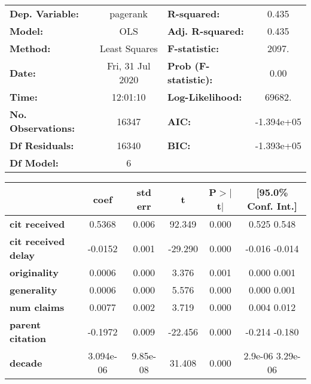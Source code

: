 \begin{center}
\begin{tabular}{lclc}
\toprule
\textbf{Dep. Variable:}     &     pagerank     & \textbf{  R-squared:         } &      0.435    \\
\textbf{Model:}             &       OLS        & \textbf{  Adj. R-squared:    } &      0.435    \\
\textbf{Method:}            &  Least Squares   & \textbf{  F-statistic:       } &      2097.    \\
\textbf{Date:}              & Fri, 31 Jul 2020 & \textbf{  Prob (F-statistic):} &      0.00     \\
\textbf{Time:}              &     12:01:10     & \textbf{  Log-Likelihood:    } &     69682.    \\
\textbf{No. Observations:}  &       16347      & \textbf{  AIC:               } &  -1.394e+05   \\
\textbf{Df Residuals:}      &       16340      & \textbf{  BIC:               } &  -1.393e+05   \\
\textbf{Df Model:}          &           6      & \textbf{                     } &               \\
\bottomrule
\end{tabular}
\begin{tabular}{lccccc}
                            & \textbf{coef} & \textbf{std err} & \textbf{t} & \textbf{P$>$$|$t$|$} & \textbf{[95.0\% Conf. Int.]}  \\
\midrule
\textbf{cit received}       &       0.5368  &        0.006     &    92.349  &         0.000        &         0.525     0.548       \\
\textbf{cit received delay} &      -0.0152  &        0.001     &   -29.290  &         0.000        &        -0.016    -0.014       \\
\textbf{originality}        &       0.0006  &        0.000     &     3.376  &         0.001        &         0.000     0.001       \\
\textbf{generality}         &       0.0006  &        0.000     &     5.576  &         0.000        &         0.000     0.001       \\
\textbf{num claims}         &       0.0077  &        0.002     &     3.719  &         0.000        &         0.004     0.012       \\
\textbf{parent citation}    &      -0.1972  &        0.009     &   -22.456  &         0.000        &        -0.214    -0.180       \\
\textbf{decade}             &    3.094e-06  &     9.85e-08     &    31.408  &         0.000        &       2.9e-06  3.29e-06       \\

\end{tabular}
\end{center}
